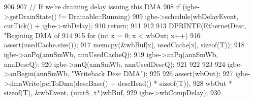 \begin{DoxyCode}
906 {
907     // If we're draining delay issuing this DMA
908     if (igbe->getDrainState() != Drainable::Running) {
909         igbe->schedule(wbDelayEvent, curTick() + igbe->wbDelay);
910         return;
911     }
912 
913     DPRINTF(EthernetDesc, "Begining DMA of %
914             
915     for (int x = 0; x < wbOut; x++) {
916         assert(usedCache.size());
917         memcpy(&wbBuf[x], usedCache[x], sizeof(T));
918         igbe->anPq(annSmWb, annUsedCacheQ);
919         igbe->anPq(annSmWb, annDescQ);
920         igbe->anQ(annSmWb, annUsedDescQ);
921     }
922 
923     
924     igbe->anBegin(annSmWb, "Writeback Desc DMA");
925 
926     assert(wbOut);
927     igbe->dmaWrite(pciToDma(descBase() + descHead() * sizeof(T)),
928                    wbOut * sizeof(T), &wbEvent, (uint8_t*)wbBuf,
929                    igbe->wbCompDelay);
930 }
\end{DoxyCode}


